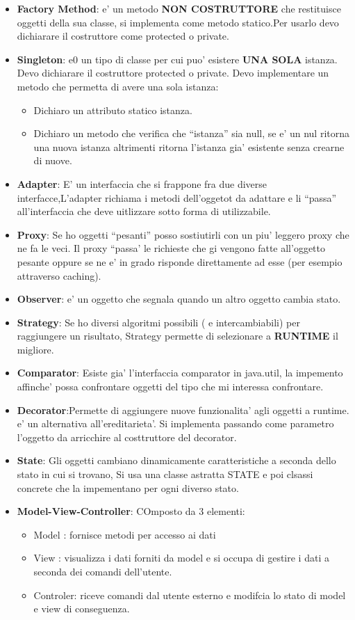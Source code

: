 \documentclass[\main/main.tex]{subfiles}
\begin{document}
\begin{itemize}
\item \textbf{Factory Method}: e' un metodo \textbf{NON COSTRUTTORE} che restituisce oggetti della sua classe, si implementa come metodo statico.Per usarlo devo dichiarare il costruttore come protected o private.
\item \textbf{Singleton}: e0 un tipo di classe per cui puo' esistere \textbf{UNA SOLA} istanza. Devo dichiarare il costruttore protected o private. Devo implementare un metodo che permetta di avere una sola istanza:
\begin{itemize}
\item Dichiaro un attributo statico istanza.
\item Dichiaro un metodo che verifica che ``istanza'' sia null, se e' un nul ritorna una nuova istanza altrimenti ritorna l'istanza gia' esistente senza crearne di nuove.
\end{itemize}
\item \textbf{Adapter}:
E' un interfaccia che si frappone fra due diverse interfacce,L'adapter richiama i metodi dell'oggetot da adattare e li ``passa'' all'interfaccia che deve uitlizzare sotto forma di utilizzabile.
\item \textbf{Proxy}: Se ho oggetti ``pesanti'' posso sostiutirli con un piu' leggero proxy che ne fa le veci. Il proxy ``passa' le richieste che gi vengono fatte all'oggetto pesante oppure se ne e' in grado risponde direttamente ad esse (per esempio attraverso caching).
\item \textbf{Observer}: e' un oggetto che segnala quando un altro oggetto cambia stato.
\item \textbf{Strategy}: Se ho diversi algoritmi possibili ( e intercambiabili) per raggiungere  un risultato, Strategy permette di selezionare a \textbf{RUNTIME} il migliore.
\item \textbf{Comparator}: Esiste gia' l'interfaccia comparator in java.util, la impemento affinche' possa confrontare oggetti del tipo che mi interessa confrontare.
\item \textbf{Decorator}:Permette di aggiungere nuove funzionalita' agli oggetti a runtime. e' un alternativa all'ereditarieta'. Si implementa passando come parametro l'oggetto da arricchire al costtruttore del decorator.
\item \textbf{State}: Gli oggetti cambiano dinamicamente caratteristiche a seconda dello stato in cui si trovano, Si usa una classe astratta STATE e poi clsassi concrete che la impementano per ogni diverso stato.
\item\textbf{Model-View-Controller}: COmposto da 3 elementi:
\begin{itemize}
\item Model : fornisce metodi per accesso ai dati
\item View  : visualizza i dati forniti da model e si occupa di gestire i dati a seconda dei comandi dell'utente.
\item Controler: riceve comandi dal utente esterno e modifcia lo stato di model e view di conseguenza.
\end{itemize}
\end{itemize}
\end{document}
